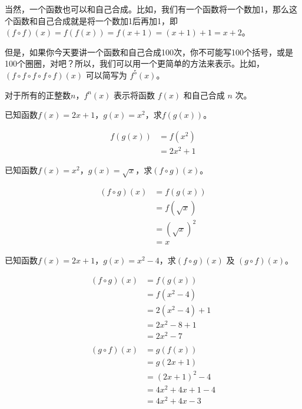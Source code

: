 \documentclass[UTF8]{ctexart}
\begin{document}
当然，一个函数也可以和自己合成。比如，我们有一个函数将一个数加1，那么这个函数和自己合成就是将一个数加1后再加1，即$(f \circ f)(x) = f(f(x)) = f(x + 1) = (x + 1) + 1 = x + 2$。

但是，如果你今天要讲一个函数和自己合成100次，你不可能写100个括号，或是100个圈圈，对吧？所以，我们可以用一个更简单的方法来表示。比如，$(f \circ f \circ f \circ f \circ f)(x)$ 可以简写为 $f^5(x)$。

\begin{info}[函数和自己合成]
    对于所有的正整数$n$，$f^n(x)$ 表示将函数 $f(x)$ 和自己合成 $n$ 次。
\end{info}

\begin{question}
    已知函数$f(x) = 2x + 1$，$g(x) = x^2$，求$f(g(x))$。
\end{question}

\begin{solution}
    \vspace{-1em}
    \begin{align*}
        f(g(x)) &= f(x^2)\\
        &= 2x^2 + 1
    \end{align*}
\end{solution}

\begin{question}
    已知函数$f(x) = x^2$，$g(x) = \sqrt{x}$，求$(f \circ g)(x)$。
\end{question}

\begin{solution}
    \vspace{-1em}
    \begin{align*}
        (f \circ g)(x) &= f(g(x))\\
        &= f(\sqrt{x})\\
        &= (\sqrt{x})^2\\
        &= x
    \end{align*}
\end{solution}

\begin{question}
    已知函数$f(x) = 2x + 1$，$g(x) = x^2 - 4$，求$(f \circ g)(x)$ 及 $(g \circ f)(x)$。
\end{question}

\begin{solution}
    \vspace{-1em}
    \begin{align*}
        (f \circ g)(x) &= f(g(x))\\
        &= f(x^2 - 4)\\
        &= 2(x^2 - 4) + 1\\
        &= 2x^2 - 8 + 1\\
        &= 2x^2 - 7\\
        \\
        (g \circ f)(x) &= g(f(x))\\
        &= g(2x + 1)\\
        &= (2x + 1)^2 - 4\\
        &= 4x^2 + 4x + 1 - 4\\
        &= 4x^2 + 4x - 3
    \end{align*}
\end{solution}
\end{document}
